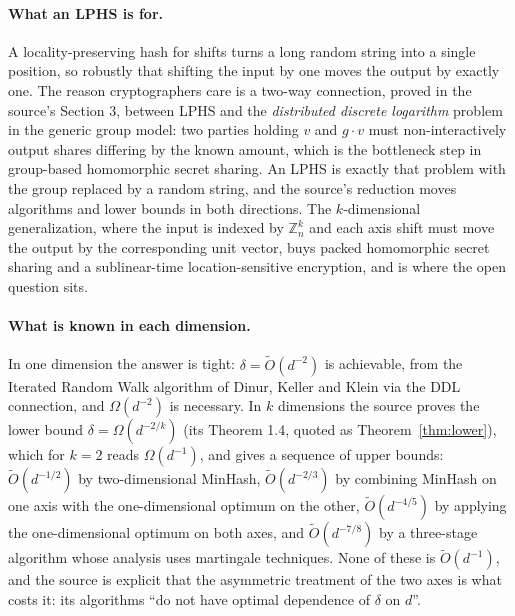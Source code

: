 \documentclass{conjura-conjecture}
\newcommand{\Z}{\mathbb{Z}}
\newcommand{\Ot}{\widetilde{O}}
\newcommand{\Om}{\Omega}
\begin{document}
\paragraph{What an LPHS is for.}
A locality-preserving hash for shifts turns a long random string into a
single position, so robustly that shifting the input by one moves the
output by exactly one. The reason cryptographers care is a two-way
connection, proved in the source's Section 3, between LPHS and the
\emph{distributed discrete logarithm} problem in the generic group
model: two parties holding $v$ and $g \cdot v$ must non-interactively
output shares differing by the known amount, which is the bottleneck
step in group-based homomorphic secret sharing. An LPHS is exactly that
problem with the group replaced by a random string, and the source's
reduction moves algorithms and lower bounds in both directions. The
$k$-dimensional generalization, where the input is indexed by
$\Z_{n}^{k}$ and each axis shift must move the output by the
corresponding unit vector, buys packed homomorphic secret sharing and a
sublinear-time location-sensitive encryption, and is where the open
question sits.

\paragraph{What is known in each dimension.}
In one dimension the answer is tight: $\delta = \Ot(d^{-2})$ is
achievable, from the Iterated Random Walk algorithm of Dinur, Keller and
Klein via the DDL connection, and $\Om(d^{-2})$ is necessary. In $k$
dimensions the source proves the lower bound
$\delta = \Om(d^{-2/k})$ (its Theorem 1.4, quoted as
Theorem~\ref{thm:lower}), which for $k = 2$ reads $\Om(d^{-1})$, and
gives a sequence of upper bounds: $\Ot(d^{-1/2})$ by two-dimensional
MinHash, $\Ot(d^{-2/3})$ by combining MinHash on one axis with the
one-dimensional optimum on the other, $\Ot(d^{-4/5})$ by applying the
one-dimensional optimum on both axes, and $\Ot(d^{-7/8})$ by a
three-stage algorithm whose analysis uses martingale techniques. None of
these is $\Ot(d^{-1})$, and the source is explicit that the asymmetric
treatment of the two axes is what costs it: its algorithms ``do not have
optimal dependence of $\delta$ on $d$''.
\end{document}
